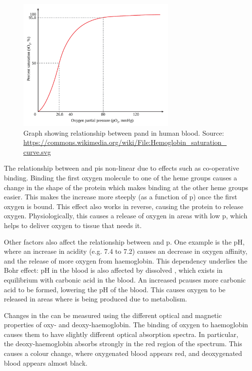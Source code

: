 \begin{figure}[t]
\centering
\includegraphics[width=0.7\textwidth]{figures/background/Hemoglobin_saturation_curve.pdf}
\caption[Graph showing relationship between p\Otwo and \SOtwo in blood]{Graph showing relationship between p\Otwo and \SOtwo in human blood. Source: \url{https://commons.wikimedia.org/wiki/File:Hemoglobin_saturation_curve.svg}}
\label{fig:back-po2so2}
\end{figure}

The relationship between \SOtwo and p\Otwo is non-linear due to effects such as co-operative binding.
Binding the first oxygen molecule to one of the heme groups causes a change in the shape of the protein which makes binding at the other heme groups easier.
This makes the \SOtwo increase more steeply (as a function of p\Otwo) once the first oxygen is bound.
This effect also works in reverse, causing the protein to release oxygen.
Physiologically, this causes a release of oxygen in areas with low p\Otwo, which helps to deliver oxygen to tissue that needs it.

Other factors also affect the relationship between \SOtwo and p\Otwo. \cite{HallGuytonHallTextbook2015}
One example is the pH, where an increase in acidity (e.g. 7.4 to 7.2) causes an decrease in oxygen affinity, and the release of more oxygen from haemoglobin.
This dependency underlies the Bohr effect:
pH in the blood is also affected by dissolved \COtwo, which exists in equilibrium with carbonic acid in the blood.
An increased p\COtwo causes more carbonic acid to be formed, lowering the pH of the blood.
This causes oxygen to be released in areas where \COtwo is being produced due to metabolism.

Changes in the \SOtwo can be measured using the different optical and magnetic properties of oxy- and deoxy-haemoglobin.
The binding of oxygen to haemoglobin causes them to have slightly different optical absorption spectra.
In particular, the deoxy-haemoglobin absorbs strongly in the red region of the spectrum.
This causes a colour change, where oxygenated blood appears red, and deoxygenated blood appears almost black.

